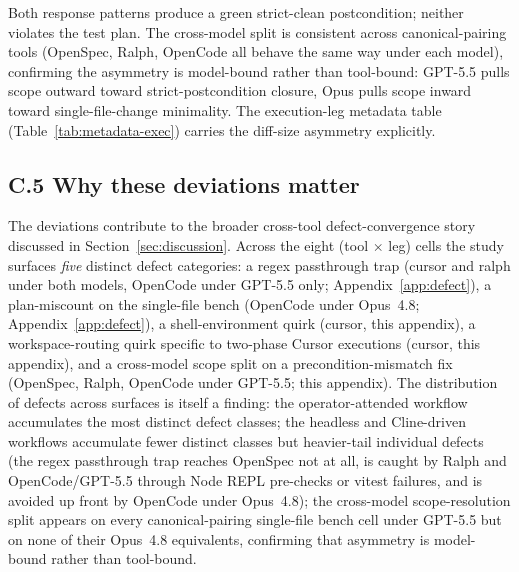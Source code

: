 Both response patterns produce a green strict-clean postcondition;
neither violates the test plan. The cross-model split is consistent
across canonical-pairing tools (OpenSpec, Ralph, OpenCode all
behave the same way under each model), confirming the asymmetry is
model-bound rather than tool-bound: GPT-5.5 pulls scope outward
toward strict-postcondition closure, Opus pulls scope inward toward
single-file-change minimality. The execution-leg metadata table
(Table~\ref{tab:metadata-exec}) carries the diff-size asymmetry
explicitly.

\subsection*{C.5 Why these deviations matter}

The deviations contribute to the broader cross-tool defect-convergence
story discussed in Section~\ref{sec:discussion}. Across the eight
(tool $\times$ leg) cells the study surfaces \emph{five} distinct
defect categories: a regex passthrough trap (cursor and ralph under
both models, OpenCode under GPT-5.5 only;
Appendix~\ref{app:defect}), a plan-miscount on the single-file bench
(OpenCode under Opus~4.8; Appendix~\ref{app:defect}), a
shell-environment quirk (cursor, this appendix), a workspace-routing
quirk specific to two-phase Cursor executions (cursor, this
appendix), and a cross-model scope split on a precondition-mismatch
fix (OpenSpec, Ralph, OpenCode under GPT-5.5; this appendix). The
distribution of defects across surfaces is itself a finding: the
operator-attended workflow accumulates the most distinct defect
classes; the headless and Cline-driven workflows accumulate fewer
distinct classes but heavier-tail individual defects (the regex
passthrough trap reaches OpenSpec not at all, is caught by Ralph and
OpenCode/GPT-5.5 through Node REPL pre-checks or vitest failures, and
is avoided up front by OpenCode under Opus~4.8); the cross-model
scope-resolution split appears on every canonical-pairing
single-file bench cell under GPT-5.5 but on none of their Opus~4.8
equivalents, confirming that asymmetry is model-bound rather than
tool-bound.
